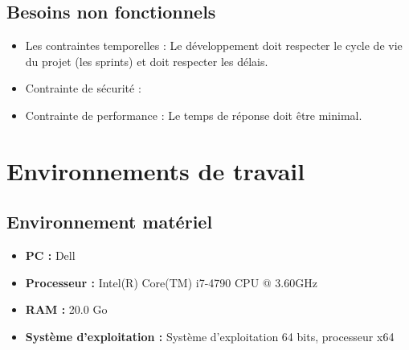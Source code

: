 \subsection{Besoins non fonctionnels }

\begin{itemize}
    \item Les contraintes temporelles : Le développement doit respecter le cycle de vie du projet (les sprints) et doit respecter les délais.
    
    \item Contrainte de sécurité : 
    
    \item Contrainte de performance : Le temps de réponse doit être minimal.
\end{itemize}

\section{Environnements de travail }
\subsection{Environnement matériel }

\begin{itemize}
    \item {\textbf{PC :}} Dell
    \item {\textbf{Processeur :}} Intel(R) Core(TM) i7-4790 CPU @ 3.60GHz
    \item {\textbf{RAM :}} 20.0 Go
    \item {\textbf{Système d'exploitation :}} Système d'exploitation 64 bits, processeur x64
    
\end{itemize}